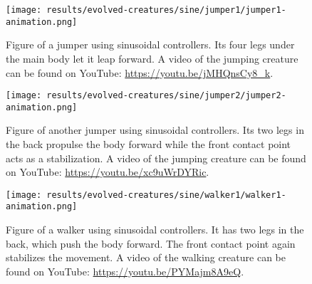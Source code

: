 \documentclass[main]{subfiles}
\begin{document}
\begin{figure}[tb]
\centering
\texttt{[image: results/evolved-creatures/sine/jumper1/jumper1-animation.png]}
\caption[Figure of a jumper using sinusoidal controllers.]{Figure of a jumper using sinusoidal controllers. Its four legs under the main body let it leap forward. A video of the jumping creature can be found on YouTube: \url{https://youtu.be/jMHQnsCy8_k}.}
\label{figure:successfulcreatures-jumper1}
\end{figure}

\begin{figure}[tb]
\centering
\texttt{[image: results/evolved-creatures/sine/jumper2/jumper2-animation.png]}
\caption[Figure of another jumper using sinusoidal controllers.]{Figure of another jumper using sinusoidal controllers. Its two legs in the back propulse the body forward while the front contact point acts as a stabilization. A video of the jumping creature can be found on YouTube: \url{https://youtu.be/xc9uWrDYRic}.}
\label{figure:successfulcreatures-jumper2}
\end{figure}

\begin{figure}[H]
\centering
\texttt{[image: results/evolved-creatures/sine/walker1/walker1-animation.png]}
\caption[Figure of a walker using sinusoidal controllers.]{Figure of a walker using sinusoidal controllers. It has two legs in the back, which push the body forward. The front contact point again stabilizes the movement. A video of the walking creature can be found on YouTube: \url{https://youtu.be/PYMajm8A9eQ}.}
\label{figure:successfulcreatures-walker1}
\end{figure}
\end{document}
